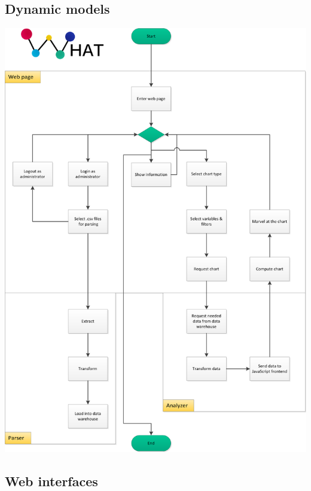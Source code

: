 \subsection{Dynamic models}
\begin{center}
\includegraphics[width=0.8\linewidth]{Pictures/Flow1.png}
\end{center} 

\newpage
\subsection{Web interfaces}
